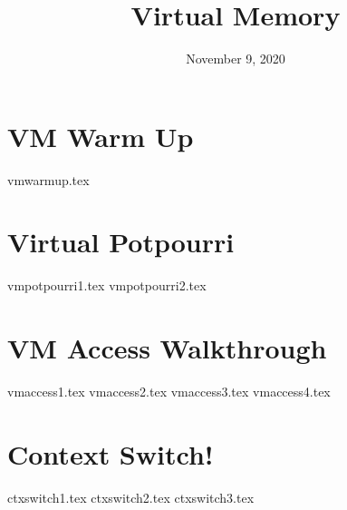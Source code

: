 \documentclass[11pt]{exam}
\title{Virtual Memory}
\date{November 9, 2020}
\begin{document}
\maketitle

\section{VM Warm Up}
\begin{questions}
{vmwarmup.tex}
\end{questions}
\newpage

\section{Virtual Potpourri}
\begin{questions}
{vmpotpourri1.tex}
{vmpotpourri2.tex}
\end{questions}
\newpage

\section{VM Access Walkthrough}
\begin{questions}
{vmaccess1.tex}
{vmaccess2.tex}
{vmaccess3.tex}
{vmaccess4.tex}
\end{questions}
\newpage

\section{Context Switch!}
\begin{questions}
{ctxswitch1.tex}
{ctxswitch2.tex}
{ctxswitch3.tex}
\end{questions}
\newpage

\end{document}
